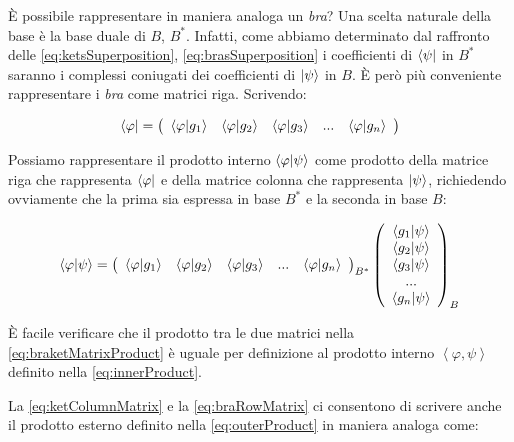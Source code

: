È possibile rappresentare in maniera analoga un \textit{bra}? Una scelta naturale della base è la base duale di $B$, $B^*$. Infatti, come abbiamo determinato dal raffronto delle \eqref{eq:ketsSuperposition}, \eqref{eq:brasSuperposition} i coefficienti di $\bra{\psi}$ in $B^*$ saranno i complessi coniugati dei coefficienti di $\ket{\psi}$ in $B$. È però più conveniente rappresentare i \textit{bra} come matrici riga. Scrivendo:

	\begin{equation} \label{eq:braRowMatrix}
		\bra{\varphi} = \left ( \begin{array}{c c c c c}
			\braket{\varphi}{g_1} & \braket{\varphi}{g_2} & \braket{\varphi}{g_3} & ... & \braket{\varphi}{g_n}
		\end{array} \right )
	\end{equation}

Possiamo rappresentare il prodotto interno $\braket{\varphi}{\psi}$ come prodotto della matrice riga che rappresenta $\bra{\varphi}$ e della matrice colonna che rappresenta $\ket{\psi}$, richiedendo ovviamente che la prima sia espressa in base $B^*$ e la seconda in base $B$:

	\begin{equation} \label{eq:braketMatrixProduct}
		\braket{\varphi}{\psi} =
		\left ( \begin{array}{c c c c c}
			\braket{\varphi}{g_1} & \braket{\varphi}{g_2} & \braket{\varphi}{g_3} & ... & \braket{\varphi}{g_n}
		\end{array} \right )_{B^*}
		\left ( \begin{array}{c}
				\braket{g_1}{\psi} \\
				\braket{g_2}{\psi} \\
				\braket{g_3}{\psi} \\
				... \\
				\braket{g_n}{\psi}
			\end{array}
		\right )_B
	\end{equation}

È facile verificare che il prodotto tra le due matrici nella \eqref{eq:braketMatrixProduct} è uguale per definizione al prodotto interno $\left \langle \varphi, \psi \right \rangle$ definito nella \eqref{eq:innerProduct}.

La \eqref{eq:ketColumnMatrix} e la \eqref{eq:braRowMatrix} ci consentono di scrivere anche il prodotto esterno definito nella \eqref{eq:outerProduct} in maniera analoga come:

